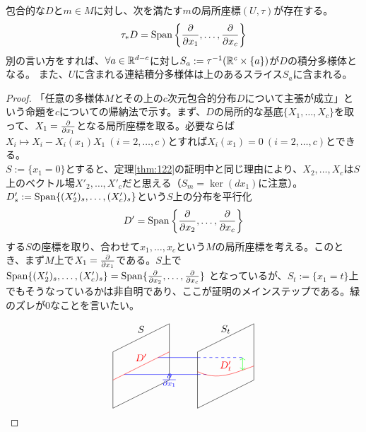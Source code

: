 \begin{thm}[Frobeniusの定理（後半）]\label{thm:123}
    包合的な$D$と$m\in M$に対し、次を満たす$m$の局所座標$(U,\tau)$が存在する。
    \[\tau_* D=\mathrm{Span}\left\{\frac{\partial }{\partial x_1},\dots,\frac{\partial }{\partial x_c}\right\}\]
    別の言い方をすれば、$\forall a\in\mathbb{R}^{d-c}$に対し$S_a:=\tau^{-1}(\mathbb{R}^c\times\{a\})$が$D$の積分多様体となる。
    また、$U$に含まれる連結積分多様体は上のあるスライス$S_a$に含まれる。
\end{thm}
\begin{proof}
    「任意の多様体$M$とその上の$c$次元包合的分布$D$について主張が成立」という命題を$c$についての帰納法で示す。まず、$D$の局所的な基底$\{X_1,\dots,X_c\}$を取って、$X_1=\frac{\partial }{\partial x_1}$となる局所座標を取る。必要ならば$X_i\mapsto X_i-X_i(x_1)X_1\ (i=2,\dots,c)$とすれば$X_i(x_1)=0\ (i=2,\dots,c)$とできる。\\
    $S:=\{x_1=0\}$とすると、定理\ref{thm:122}の証明中と同じ理由により、$X_2,\dots,X_c$は$S$上のベクトル場$X'_2,\dots,X'_c$だと思える（$S_m=\ker(dx_1)$に注意）。$D'_s:=\mathrm{Span}\{(X'_2)_s,\dots,(X'_c)_s\}$という$S$上の分布を平行化
    \[D'=\mathrm{Span}\left\{\frac{\partial }{\partial x_2},\dots,\frac{\partial }{\partial x_c}\right\}\]
    する$S$の座標を取り、合わせて$x_1,\dots,x_c$という$M$の局所座標を考える。このとき、まず$M$上で$X_1=\frac{\partial }{\partial x_1}$である。$S$上で$\mathrm{Span}\{(X'_2)_s,\dots,(X'_c)_s\}=\mathrm{Span}\{\frac{\partial }{\partial x_2},\dots,\frac{\partial }{\partial x_c}\}$ となっているが、$S_t:=\{x_1=t\}$上でもそうなっているかは非自明であり、ここが証明のメインステップである。緑のズレが0なことを言いたい。
    
    \[\begin{tikzpicture}
    \draw (0,2)--(0,0)--(2,1)--(2,3)--(0,2);
    \draw (3,2)--(3,0)--(5,1)--(5,3)--(3,2);
    \draw (1,2.8)node{$S$};
    \draw (4,2.8)node{$S_t$};
    
    \draw[blue] (0.4,1.2)--(3,1.2);
    \draw[blue,dashed] (3,1.2)--(3.4,1.2);
    \draw[blue] (1.6,1.8)--(3,1.8);
    \draw[blue,dashed] (3,1.8)--(4.6,1.8);
    \draw[blue] (2,1)node{$\pdiff{}{x_1}$};
    
    \draw[red] (0,1)--(2,2);
    \draw[red] (3,1.3) to [out=-25,in=200] (5,1.5);
    \draw[red] (1,1.8)node{$D'$};
    \draw[red] (4,1.5)node{$D'_t$};
    
    \draw[green][<->](4.6,1.8)--(4.6,1.35);
\end{tikzpicture}\]
    

\end{proof}
